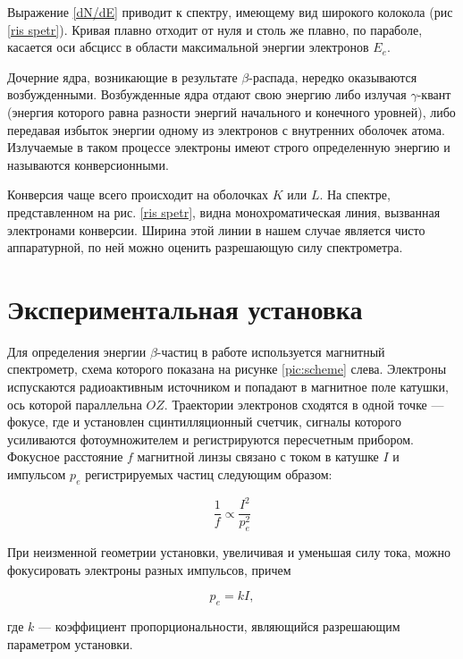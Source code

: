 \documentclass[12pt]{kiarticle}
\begin{document}
Выражение \eqref{dN/dE} приводит к спектру, имеющему вид широкого колокола (рис \ref{ris spetr}). Кривая плавно отходит от нуля и столь же плавно, по параболе, касается оси абсцисс в области максимальной энергии электронов $E_e$. 

Дочерние ядра, возникающие в результате $\beta$-распада, нередко оказываются возбужденными. Возбужденные ядра отдают свою энергию либо излучая $\gamma$-квант (энергия которого равна разности энергий начального и конечного уровней), либо передавая избыток энергии одному из электронов с внутренних оболочек атома. Излучаемые в таком процессе электроны имеют строго определенную энергию и называются конверсионными.

Конверсия чаще всего происходит на оболочках $ K $ или $ L $. На спектре, представленном на рис. \ref{ris spetr}, видна монохроматическая линия, вызванная электронами конверсии. Ширина этой линии в нашем случае является чисто аппаратурной, по ней можно оценить разрешающую силу спектрометра.


\section{Экспериментальная установка}
	
	Для определения энергии $\beta$-частиц в работе используется магнитный спектрометр, схема которого показана на рисунке \ref{pic:scheme} слева. Электроны испускаются радиоактивным источником и попадают в магнитное поле катушки, ось которой параллельна $OZ$. Траектории электронов сходятся в одной точке --- фокусе, где и установлен сцинтилляционный счетчик, сигналы которого усиливаются фотоумножителем и регистрируются пересчетным прибором. Фокусное расстояние $f$ магнитной линзы связано с током в катушке $I$ и импульсом $p_e$ регистрируемых частиц следующим образом:
	
	\[ \frac{1}{f} \propto \frac{I^2}{p_e^2} \]  
	
	При неизменной геометрии установки, увеличивая и уменьшая силу тока, можно фокусировать электроны разных импульсов, причем 
	
	\begin{equation}\label{k}
	p_e = kI,
	\end{equation}
	
	 где $k$ --- коэффициент пропорциональности, являющийся разрешающим параметром установки.
\end{document}

